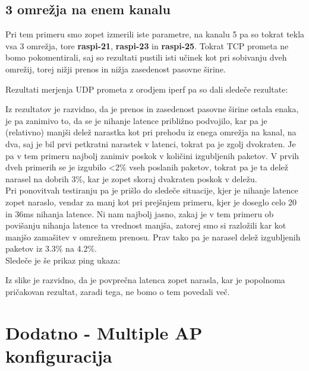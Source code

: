 \documentclass[11pt,a4paper,slovene]{article}
\begin{document}
\subsection{3 omrežja na enem kanalu}
Pri tem primeru smo zopet izmerili iste parametre, na kanalu 5 pa so tokrat tekla vsa 3 omrežja, tore \textbf{raspi-21}, \textbf{raspi-23} in \textbf{raspi-25}. Tokrat TCP prometa ne bomo pokomentirali, saj so rezultati pustili isti učinek kot pri sobivanju dveh omrežij, torej nižji prenos in nižja zasedenost pasovne širine.

Rezultati merjenja UDP prometa z orodjem iperf pa so dali sledeče rezultate:

Iz rezultatov je razvidno, da je prenos in zasedenost pasovne širine ostala enaka, je pa zanimivo to, da se je nihanje latence približno podvojilo, kar pa je (relativno) manjši delež narastka kot pri prehodu iz enega omrežja na kanal, na dva, saj je bil prvi petkratni narastek v latenci, tokrat pa je zgolj dvokraten. Je pa v tem primeru najbolj zanimiv poskok v količini izgubljenih paketov. V prvih dveh primerih se je izgubilo <2\% vseh poslanih paketov, tokrat pa je ta delež narasel na dobrih 3\%, kar je zopet skoraj dvakraten poskok v deležu.\\
Pri ponovitvah testiranju pa je prišlo do sledeče situacije, kjer je nihanje latence zopet naraslo, vendar za manj kot pri prejšnjem primeru, kjer je doseglo celo 20 in 36ms nihanja latence. Ni nam najbolj jasno, zakaj je v tem primeru ob povišanju nihanja latence ta vrednost manjša, zatorej smo si razložili kar kot manjšo zamašitev v omrežnem prenosu. Prav tako pa je narasel delež izgubljenih paketov iz 3.3\% na 4.2\%.\\

Sledeče je še prikaz ping ukaza:

Iz slike je razvidno, da je povprečna latenca zopet narasla, kar je popolnoma pričakovan rezultat, zaradi tega, ne bomo o tem povedali več.
 

\section{Dodatno - Multiple AP konfiguracija}
\end{document}
